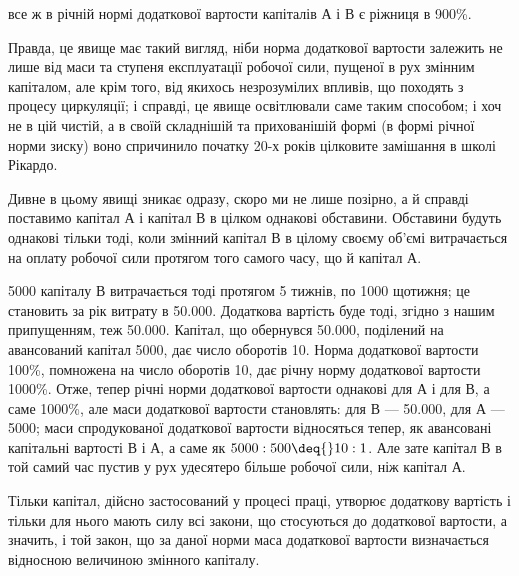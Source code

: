 \parcont{}  %
все ж в річній нормі додаткової вартости капіталів $А$ і $В$ є ріжниця в
900\%.

Правда, це явище має такий вигляд, ніби норма додаткової вартости
залежить не лише від маси та ступеня експлуатації робочої сили,
пущеної в рух змінним капіталом, але крім того, від якихось незрозумілих
впливів, що походять з процесу циркуляції; і справді, це явище
освітлювали саме таким способом; і хоч не в цій чистій, а в своїй складнішій
та прихованішій формі (в формі річної норми зиску) воно спричинило
початку 20-х років цілковите замішання в школі Рікардо.

Дивне в цьому явищі зникає одразу, скоро ми не лише позірно, а
й справді поставимо капітал $А$ і капітал $В$ в цілком однакові обставини.
Обставини будуть однакові тільки тоді, коли змінний капітал $В$ в цілому
своєму об’ємі витрачається на оплату робочої сили протягом того
самого часу, що й капітал $А$.

5000 капіталу $В$ витрачається тоді протягом 5 тижнів, по
1000 щотижня; це становить за рік витрату в \num{50.000}.
Додаткова вартість буде тоді, згідно з нашим припущенням, теж \deq{} \num{50.000}. Капітал, що обернувся \deq{} \num{50.000}, поділений на авансований
капітал \deq{} 5000, дає число оборотів \deq{} 10. Норма додаткової
вартости \deq{}  \deq{} 100\%, помножена на число оборотів \deq{} 10, дає річну норму додаткової
вартости \deq{}  \deq{}  \deq{} 1000\%. Отже, тепер річні норми додаткової вартости однакові для
$А$ і для $В$, а саме
1000\%, але маси додаткової вартости становлять: для $В$ — \num{50.000},
для $А$ — 5000; маси спродукованої додаткової вартости відносяться
тепер, як авансовані капітальні вартості $В$ і $А$, а саме як
$5000 : 500 \deq{} 10 : 1$. Але зате капітал $В$ в той самий час пустив у рух удесятеро
більше робочої сили, ніж капітал $А$.

Тільки капітал, дійсно застосований у процесі праці, утворює додаткову
вартість і тільки для нього мають силу всі закони, що стосуються
до додаткової вартости, а значить, і той закон, що за даної норми маса
додаткової вартости визначається відносною величиною змінного капіталу.

